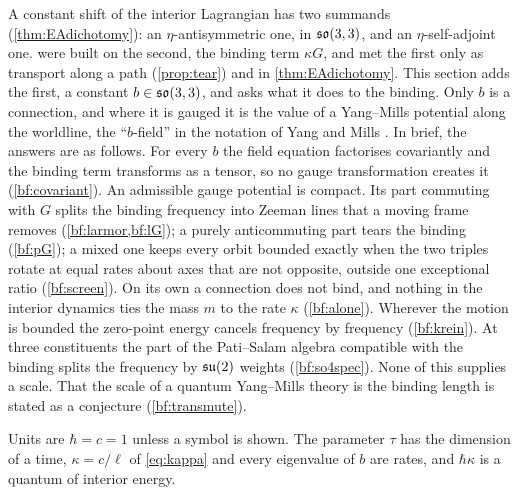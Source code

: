 A constant shift of the interior Lagrangian has two summands (\cref{thm:EAdichotomy}): an $\eta$-antisymmetric one, in $\mathfrak{so}(3,3)$, and an
$\eta$-self-adjoint one.  were built on the second, the binding term $\kappa G$, and met the first only as transport along a path (\cref{prop:tear}) and in \cref{thm:EAdichotomy}. This section adds the
first, a constant $b\in\mathfrak{so}(3,3)$, and asks what it does to the binding. Only $b$ is a connection, and where it is gauged it is the value of a
Yang--Mills potential along the worldline, the ``$b$-field'' in the notation of Yang and Mills \cite{YangMills54}. In brief, the answers are as follows. For
every $b$ the field equation factorises covariantly and the binding term transforms as a tensor, so no gauge transformation creates it
(\cref{bf:covariant}). An admissible gauge potential is compact. Its part commuting with $G$ splits the binding frequency into Zeeman lines that a
moving frame removes (\cref{bf:larmor,bf:lG}); a purely anticommuting part tears the binding (\cref{bf:pG}); a mixed one keeps every orbit bounded
exactly when the two triples rotate at equal rates about axes that are not opposite, outside one exceptional ratio (\cref{bf:screen}). On its own
a connection does not bind, and nothing in the interior dynamics ties the mass $m$ to the rate $\kappa$ (\cref{bf:alone}). Wherever the motion is
bounded the zero-point energy cancels frequency by frequency (\cref{bf:krein}). At three constituents the part of the Pati--Salam algebra
compatible with the binding splits the frequency by $\mathfrak{su}(2)$ weights (\cref{bf:so4spec}). None of this supplies a scale. That the scale of a quantum
Yang--Mills theory is the binding length is stated as a conjecture (\cref{bf:transmute}).

Units are $\hbar=c=1$ unless a symbol is shown. The parameter $\tau$ has the dimension of a time, $\kappa=c/\ell$ of \eqref{eq:kappa} and every
eigenvalue of $b$ are rates, and $\hbar\kappa$ is a quantum of interior energy.

